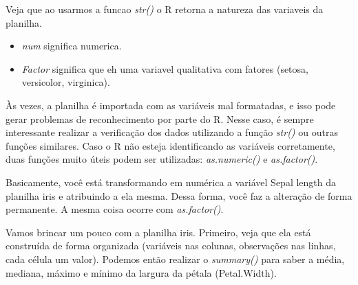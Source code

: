 \documentclass[
]{book}
\newenvironment{Shaded}{\begin{snugshade}}{\end{snugshade}}
\newcommand{\CommentTok}[1]{\textcolor[rgb]{0.56,0.35,0.01}{\textit{#1}}}
\newcommand{\FunctionTok}[1]{\textcolor[rgb]{0.13,0.29,0.53}{\textbf{#1}}}
\newcommand{\NormalTok}[1]{#1}
\newcommand{\OtherTok}[1]{\textcolor[rgb]{0.56,0.35,0.01}{#1}}
\newcommand{\SpecialCharTok}[1]{\textcolor[rgb]{0.81,0.36,0.00}{\textbf{#1}}}
\providecommand{\tightlist}{%
  \setlength{\itemsep}{0pt}\setlength{\parskip}{0pt}}
\begin{document}
Veja que ao usarmos a funcao \emph{str()} o R retorna a natureza das variaveis da planilha.

\begin{itemize}
\tightlist
\item
  \emph{num} significa numerica.
\item
  \emph{Factor} significa que eh uma variavel qualitativa com fatores (setosa, versicolor, virginica).
\end{itemize}

Às vezes, a planilha é importada com as variáveis mal formatadas, e isso pode gerar problemas de reconhecimento por parte do R. Nesse caso, é sempre interessante realizar a verificação dos dados utilizando a função \emph{str()} ou outras funções similares. Caso o R não esteja identificando as variáveis corretamente, duas funções muito úteis podem ser utilizadas: \emph{as.numeric()} e \emph{as.factor()}.

\begin{Shaded}
\end{Shaded}

Basicamente, você está transformando em numérica a variável Sepal length da planilha iris e atribuindo a ela mesma. Dessa forma, você faz a alteração de forma permanente. A mesma coisa ocorre com \emph{as.factor()}.

Vamos brincar um pouco com a planilha iris. Primeiro, veja que ela está construída de forma organizada (variáveis nas colunas, observações nas linhas, cada célula um valor). Podemos então realizar o \emph{summary()} para saber a média, mediana, máximo e mínimo da largura da pétala (Petal.Width).

\begin{Shaded}
\end{Shaded}
\end{document}
